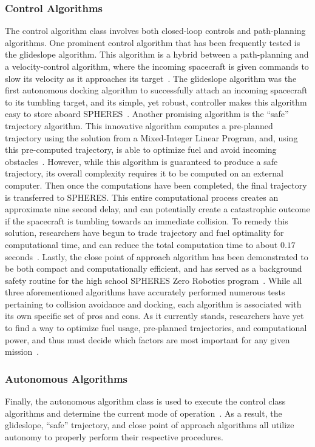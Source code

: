 \documentclass[journal, 10pt]{IEEEtran}
\begin{document}
\subsubsection{Control Algorithms}
The control algorithm class involves both closed-loop controls and path-planning algorithms. One prominent control algorithm that has been frequently tested is the glideslope algorithm. This algorithm is a hybrid between a path-planning and a velocity-control algorithm, where the incoming spacecraft is given commands to slow its velocity as it approaches its target~\cite{SPHERES_form, SPHERES_micro, dist, virt_sim}. The glideslope algorithm was the first autonomous docking algorithm to successfully attach an incoming spacecraft to its tumbling target, and its simple, yet robust, controller makes this algorithm easy to store aboard SPHERES~\cite{SPHERES_micro}. Another promising algorithm is the ``safe'' trajectory algorithm. This innovative algorithm computes a pre-planned trajectory using the solution from a Mixed-Integer Linear Program, and, using this pre-computed trajectory, is able to optimize fuel and avoid incoming obstacles~\cite{SPHERES_micro}. However, while this algorithm is guaranteed to produce a safe trajectory, its overall complexity requires it to be computed on an external computer. Then once the computations have been completed, the final trajectory is transferred to SPHERES. This entire computational process creates an approximate nine second delay, and can potentially create a catastrophic outcome if the spacecraft is tumbling towards an immediate collision. To remedy this solution, researchers have begun to trade trajectory and fuel optimality for computational time, and can reduce the total computation time to about $0.17$ seconds~\cite{SPHERES_micro}. Lastly, the close point of approach algorithm has been demonstrated to be both compact and computationally efficient, and has served as a background safety routine for the high school SPHERES Zero Robotics program~\cite{virt_sim}. While all three aforementioned algorithms have accurately performed numerous tests pertaining to collision avoidance and docking, each algorithm is associated with its own specific set of pros and cons. As it currently stands, researchers have yet to find a way to optimize fuel usage, pre-planned trajectories, and computational power, and thus must decide which factors are most important for any given mission~\cite{SPHERES_form, SPHERES_micro, dist, virt_sim}.

\subsubsection{Autonomous Algorithms}
Finally, the autonomous algorithm class is used to execute the control class algorithms and determine the current mode of operation~\cite{SPHERES_form}. As a result, the glideslope, ``safe'' trajectory, and close point of approach algorithms all utilize autonomy to properly perform their respective procedures. 
\end{document}
